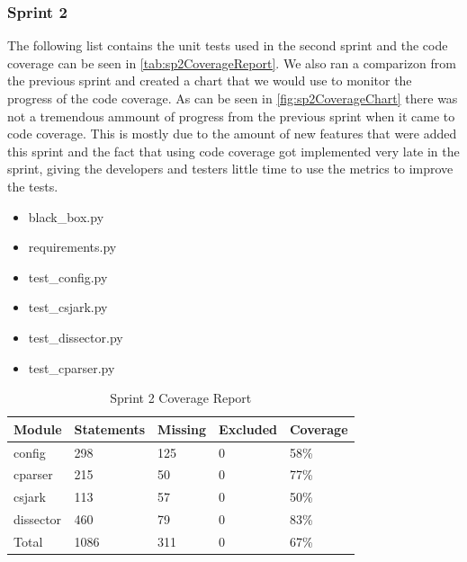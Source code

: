 \subsubsection{Sprint 2}
The following list contains the unit tests used in the second sprint and the code coverage can be seen in \autoref{tab:sp2CoverageReport}. We also ran a comparizon from the previous sprint and created a chart that we would use to monitor the progress of the code coverage. As can be seen in \autoref{fig:sp2CoverageChart} there was not a tremendous ammount of progress from the previous sprint when it came to code coverage. This is mostly due to the amount of new features that were added this sprint and the fact that using code coverage got implemented very late in the sprint, giving the developers and testers little time to use the metrics to improve the tests.

\begin{itemize}
\item black\_box.py
\item requirements.py
\item test\_config.py
\item test\_csjark.py
\item test\_\gls{dissector}.py
\item test\_cparser.py
\end {itemize}

\begin{table}[!htb]\footnotesize\center
	\caption{Sprint 2 Coverage Report\label{tab:sp2CoverageReport}}
	\begin{tabular}{l l l l l}
		\toprule
		Module & Statements & Missing & Excluded & Coverage\\
		\midrule
		config & 298 & 125 & 0 & 58\%\ \\
		cparser & 215 & 50 & 0 & 77\%\ \\
		csjark & 113 & 57 & 0 & 50\%\ \\
		\gls{dissector} & 460 & 79 & 0 & 83\%\ \\
		Total & 1086 & 311 & 0 & 67\%\ \\
		\bottomrule
	\end{tabular}
\end{table}

